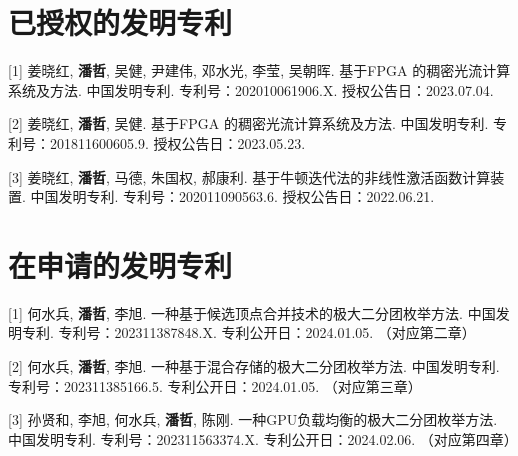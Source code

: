 \section*{已授权的发明专利}

[1] 姜晓红, \textbf{潘哲}, 吴健, 尹建伟, 邓水光, 李莹, 吴朝晖. 基于FPGA 的稠密光流计算系统及方法. 中国发明专利. 专利号：202010061906.X. 授权公告日：2023.07.04.

[2] 姜晓红, \textbf{潘哲}, 吴健. 基于FPGA 的稠密光流计算系统及方法. 中国发明专利. 专利号：201811600605.9. 授权公告日：2023.05.23.

[3] 姜晓红, \textbf{潘哲}, 马德, 朱国权, 郝康利. 基于牛顿迭代法的非线性激活函数计算装置. 中国发明专利. 专利号：202011090563.6. 授权公告日：2022.06.21.

\section*{在申请的发明专利}

[1] 何水兵, \textbf{潘哲}, 李旭. 一种基于候选顶点合并技术的极大二分团枚举方法. 中国发明专利. 专利号：202311387848.X. 专利公开日：2024.01.05. （对应第二章）

[2] 何水兵, \textbf{潘哲}, 李旭. 一种基于混合存储的极大二分团枚举方法. 中国发明专利. 专利号：202311385166.5. 专利公开日：2024.01.05. （对应第三章）

[3] 孙贤和, 李旭, 何水兵, \textbf{潘哲}, 陈刚. 一种GPU负载均衡的极大二分团枚举方法. 中国发明专利. 专利号：202311563374.X. 专利公开日：2024.02.06. （对应第四章）



